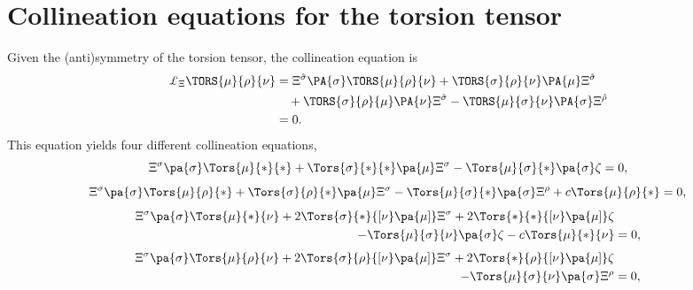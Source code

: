 \documentclass[aps,prd,12pt,superscriptaddress,showpacs,showkeys,reprint]{revtex4-1}
\begin{document}
\appendix

\section{Collineation equations for the torsion tensor}

Given the (anti)symmetry of the torsion tensor, the collineation equation is
\begin{equation}
  \begin{split}
    \pounds_\Xi \TORS{\mu}{\rho}{\nu} &= \Xi^{\hat{\sigma}} \PA{\sigma} \TORS{\mu}{\rho}{\nu} + \TORS{\sigma }{\rho}{\nu} \PA{\mu} \Xi^{\hat{\sigma}} \\
    & \quad + \TORS{\sigma }{\rho}{\mu} \PA{\nu} \Xi^{\hat{\sigma}}- \TORS{\mu}{\sigma}{\nu} \PA{\sigma} \Xi^{\hat{\rho}} \\
    &= 0.
  \end{split}
\end{equation}
This equation yields four different collineation equations,
\begin{equation}
    \Xi^\sigma \pa{\sigma} \Tors{\mu}{*}{*} + \Tors{\sigma}{*}{*} \pa{\mu} \Xi^\sigma - \Tors{\mu}{\sigma}{*} \pa{\sigma} \zeta = 0,
\end{equation}
\begin{equation}
  \Xi^\sigma \pa{\sigma} \Tors{\mu}{\rho}{*} + \Tors{\sigma}{\rho}{*} \pa{\mu} \Xi^\sigma - \Tors{\mu}{\sigma}{*} \pa{\sigma} \Xi^\rho + c \Tors{\mu}{\rho}{*} = 0,
\end{equation}
\begin{equation}
  \begin{split}
    \Xi^\sigma \pa{\sigma} \Tors{\mu}{*}{\nu} + 2 \Tors{\sigma}{*}{[\nu} \pa{\mu]} \Xi^\sigma + 2 \Tors{*}{*}{[\nu} \pa{\mu]} \zeta & \\
    - \Tors{\mu}{\sigma}{\nu} \pa{\sigma} \zeta - c \Tors{\mu}{*}{\nu} &= 0,
  \end{split}
\end{equation}
\begin{equation}
  \begin{split}
    \Xi^\sigma \pa{\sigma} \Tors{\mu}{\rho}{\nu} + 2 \Tors{\sigma}{\rho}{[\nu} \pa{\mu]} \Xi^\sigma + 2 \Tors{*}{\rho}{[\nu} \pa{\mu]} \zeta & \\
    - \Tors{\mu}{\sigma}{\nu} \pa{\sigma} \Xi^\rho &= 0,
  \end{split}  
\end{equation}



\end{document}
